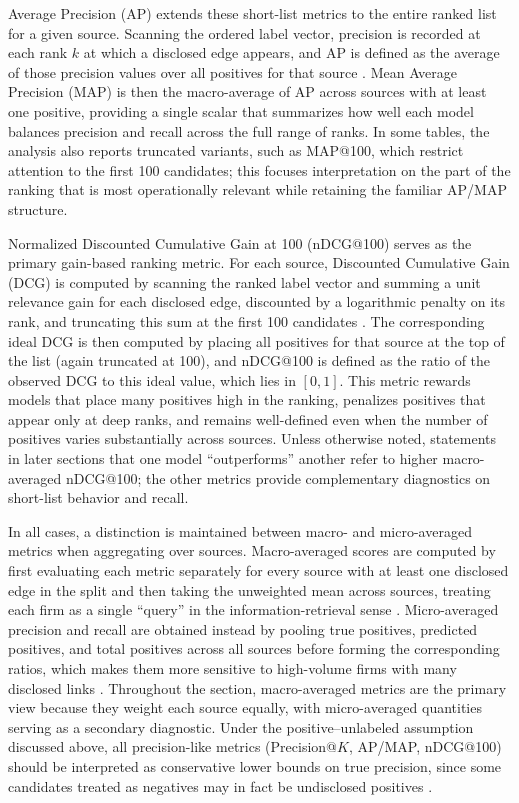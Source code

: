 Average Precision (AP) extends these short-list metrics to the entire ranked list for a given source. Scanning the ordered label vector, precision is recorded at each rank $k$ at which a disclosed edge appears, and AP is defined as the average of those precision values over all positives for that source \parencite{manning_introduction_2008,shani_evaluating_2011}. Mean Average Precision (MAP) is then the macro-average of AP across sources with at least one positive, providing a single scalar that summarizes how well each model balances precision and recall across the full range of ranks. In some tables, the analysis also reports truncated variants, such as MAP@100, which restrict attention to the first 100 candidates; this focuses interpretation on the part of the ranking that is most operationally relevant while retaining the familiar AP/MAP structure.

Normalized Discounted Cumulative Gain at 100 (nDCG@100) serves as the primary gain-based ranking metric. For each source, Discounted Cumulative Gain (DCG) is computed by scanning the ranked label vector and summing a unit relevance gain for each disclosed edge, discounted by a logarithmic penalty on its rank, and truncating this sum at the first 100 candidates \parencite{jarvelin_cumulated_2002}. The corresponding ideal DCG is then computed by placing all positives for that source at the top of the list (again truncated at 100), and nDCG@100 is defined as the ratio of the observed DCG to this ideal value, which lies in $[0,1]$. This metric rewards models that place many positives high in the ranking, penalizes positives that appear only at deep ranks, and remains well-defined even when the number of positives varies substantially across sources. Unless otherwise noted, statements in later sections that one model ``outperforms'' another refer to higher macro-averaged nDCG@100; the other metrics provide complementary diagnostics on short-list behavior and recall.

In all cases, a distinction is maintained between macro- and micro-averaged metrics when aggregating over sources. Macro-averaged scores are computed by first evaluating each metric separately for every source with at least one disclosed edge in the split and then taking the unweighted mean across sources, treating each firm as a single ``query'' in the information-retrieval sense \parencite{manning_introduction_2008}. Micro-averaged precision and recall are obtained instead by pooling true positives, predicted positives, and total positives across all sources before forming the corresponding ratios, which makes them more sensitive to high-volume firms with many disclosed links \parencite{manning_introduction_2008, shani_evaluating_2011}. Throughout the section, macro-averaged metrics are the primary view because they weight each source equally, with micro-averaged quantities serving as a secondary diagnostic. Under the positive--unlabeled assumption discussed above, all precision-like metrics (Precision@$K$, AP/MAP, nDCG@100) should be interpreted as conservative lower bounds on true precision, since some candidates treated as negatives may in fact be undisclosed positives \parencite{elkan_learning_2008}.

